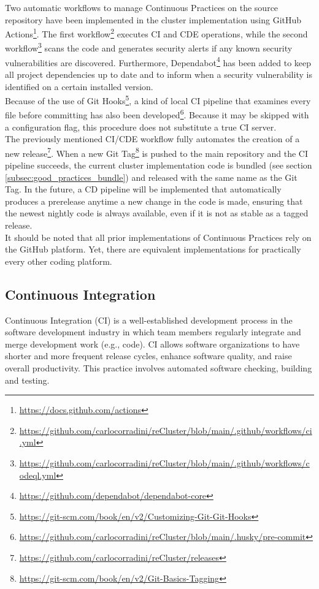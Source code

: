 Two automatic workflows to manage Continuous Practices on the source repository have
been implemented in the cluster implementation using GitHub Actions\footnote{\url{https://docs.github.com/actions}}.
The first workflow\footnote{\url{https://github.com/carlocorradini/reCluster/blob/main/.github/workflows/ci.yml}}
executes CI and CDE operations, while the second workflow\footnote{\url{https://github.com/carlocorradini/reCluster/blob/main/.github/workflows/codeql.yml}}
scans the code and generates security alerts if any known security vulnerabilities
are discovered. Furthermore, Dependabot\footnote{\url{https://github.com/dependabot/dependabot-core}}
has been added to keep all project dependencies up to date and to inform when a security
vulnerability is identified on a certain installed version. \\ %
Because of the use of Git Hooks\footnote{\url{https://git-scm.com/book/en/v2/Customizing-Git-Git-Hooks}},
a kind of local CI pipeline that examines every file before committing has also
been developed\footnote{\url{https://github.com/carlocorradini/reCluster/blob/main/.husky/pre-commit}}.
Because it may be skipped with a configuration flag, this procedure does not
substitute a true CI server. \\ %
The previously mentioned CI/CDE workflow fully automates the creation of a new
release\footnote{\url{https://github.com/carlocorradini/reCluster/releases}}. When
a new Git Tag\footnote{\url{https://git-scm.com/book/en/v2/Git-Basics-Tagging}} is
pushed to the main repository and the CI pipeline succeeds, the current cluster
implementation code is bundled (see section \ref{subsec:good_practices_bundle})
and released with the same name as the Git Tag. In the future, a CD pipeline
will be implemented that automatically produces a prerelease anytime a new
change in the code is made, ensuring that the newest nightly code is always available,
even if it is not as stable as a tagged release. \\ %
It should be noted that all prior implementations of Continuous Practices rely
on the GitHub platform. Yet, there are equivalent implementations for
practically every other coding platform.

\subsection{Continuous Integration}
\label{subsec:good_practices_continuous_practices_continuous_integration}

Continuous Integration (CI) is a well-established development process in the software
development industry in which team members regularly integrate and merge development
work (e.g., code). CI allows software organizations to have shorter and more
frequent release cycles, enhance software quality, and raise overall
productivity. This practice involves automated software checking, building and
testing\cite{continuous_practices}.

